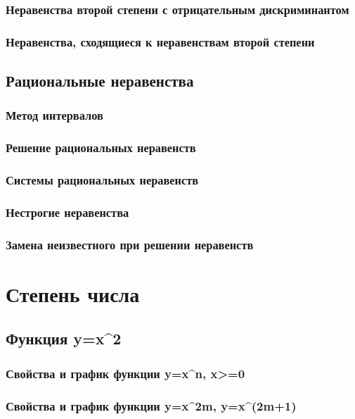 \documentclass[a4paper, 12pt]{article}
\begin{document}
            \subsubsection{Неравенства второй степени с отрицательным дискриминантом}
            \subsubsection{Неравенства, сходящиеся к неравенствам второй степени}
        \subsection{Рациональные неравенства}
            \subsubsection{Метод интервалов}
            \subsubsection{Решение рациональных неравенств}
            \subsubsection{Системы рациональных неравенств}
            \subsubsection{Нестрогие неравенства}
            \subsubsection{Замена неизвестного при решении неравенств}
    \section{Степень числа}
        \subsection{Функция y=x^2}
            \subsubsection{Свойства и график функции y=x^n, x>=0}
            \subsubsection{Свойства и график функции y=x^2m, y=x^(2m+1)}
    
\end{document}
